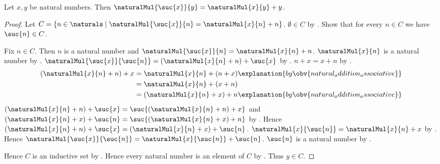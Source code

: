 \begin{theorem}\label{natural_multiplication_successor_left}
    Let $x,y$ be natural numbers.
    Then $\naturalMul{\suc{x}}{y}=\naturalMul{x}{y}+y$.
\end{theorem}
\begin{proof}
    Let $C=\{n\in\naturals\mid
        \text{$\naturalMul{\suc{x}}{n}=\naturalMul{x}{n}+n$}\}$.
    $\emptyset\in C$
        by .
    Show that for every $n\in C$ we have $\suc{n}\in C$.
    \begin{subproof}
        Fix $n\in C$.
        Then $n$ is a natural number and
            $\naturalMul{\suc{x}}{n}=\naturalMul{x}{n}+n$.
        $\naturalMul{x}{n}$ is a natural number
            by .
        $\naturalMul{\suc{x}}{\suc{n}}
            =(\naturalMul{x}{n}+n)+\suc{x}$
            by .
        $n+x=x+n$ by .
        \begin{align*}
            (\naturalMul{x}{n}+n)+x
                &= \naturalMul{x}{n}+(n+x)
                    \explanation{by \obv{natural_addition_associative}}
                \\
                &= \naturalMul{x}{n}+(x+n)
                \\
                &= (\naturalMul{x}{n}+x)+n
                    \explanation{by \obv{natural_addition_associative}}
        \end{align*}
        $(\naturalMul{x}{n}+n)+\suc{x}
            =\suc{(\naturalMul{x}{n}+n)+x}$ and
            $(\naturalMul{x}{n}+x)+\suc{n}
            =\suc{(\naturalMul{x}{n}+x)+n}$
            by .
        Hence $(\naturalMul{x}{n}+n)+\suc{x}
            =(\naturalMul{x}{n}+x)+\suc{n}$.
        $\naturalMul{x}{\suc{n}}=\naturalMul{x}{n}+x$
            by .
        Hence $\naturalMul{\suc{x}}{\suc{n}}
            =\naturalMul{x}{\suc{n}}+\suc{n}$.
        $\suc{n}$ is a natural number by .
    \end{subproof}
    Hence $C$ is an inductive set by .
    Hence every natural number is an element of $C$
        by .
    Thus $y\in C$.
\end{proof}

